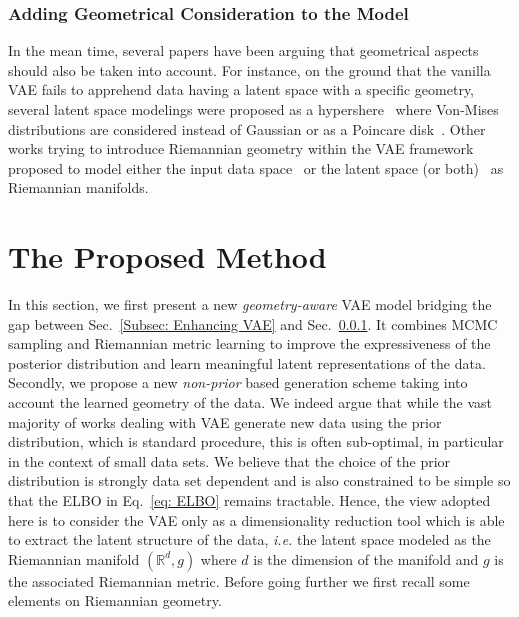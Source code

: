 \documentclass[10pt,journal,compsoc]{IEEEtran}
\begin{document}
\subsubsection{Adding Geometrical Consideration to the Model}\label{Subsec: geometry to model}
In the mean time, several papers have been arguing that geometrical aspects should also be taken into account. For instance, on the ground that the vanilla VAE fails to apprehend data having a latent space with a specific geometry, several latent space modelings were proposed as a hypershere~\cite{davidson_hyperspherical_2018} where Von-Mises distributions are considered instead of Gaussian or as a Poincare disk~\cite{mathieu_continuous_2019,ovinnikov_poincare_2020}. Other works trying to introduce Riemannian geometry within the VAE framework proposed to model either the input data space~\cite{falorsi_explorations_2018, miolane_learning_2020} or the latent space (or both)~\cite{arvanitidis_locally_2016,chen_metrics_2018,shao_riemannian_2018, kalatzis_variational_2020} as Riemannian manifolds. 

\section{The Proposed Method}

In this section, we first present a new \emph{geometry-aware} VAE model bridging the gap between Sec.~\ref{Subsec: Enhancing VAE} and Sec.~\ref{Subsec: geometry to model}. It combines MCMC sampling and Riemannian metric learning to improve the expressiveness of the posterior distribution and learn meaningful latent representations of the data. Secondly, we propose a new \emph{non-prior} based generation scheme taking into account the learned geometry of the data. We indeed argue that while the vast majority of works dealing with VAE generate new data using the prior distribution, which is standard procedure, this is often sub-optimal, in particular in the context of small data sets. We believe that the choice of the prior distribution is strongly data set dependent and is also constrained to be simple so that the ELBO in Eq.~\eqref{eq: ELBO} remains tractable. Hence, the view adopted here is to consider the VAE only as a dimensionality reduction tool which is able to extract the latent structure of the data, \emph{i.e.} the latent space modeled as the Riemannian manifold $(\mathbb{R}^d, g)$ where $d$ is the dimension of the manifold and $g$ is the associated Riemannian metric. Before going further we first recall some elements on Riemannian geometry.
\end{document}

